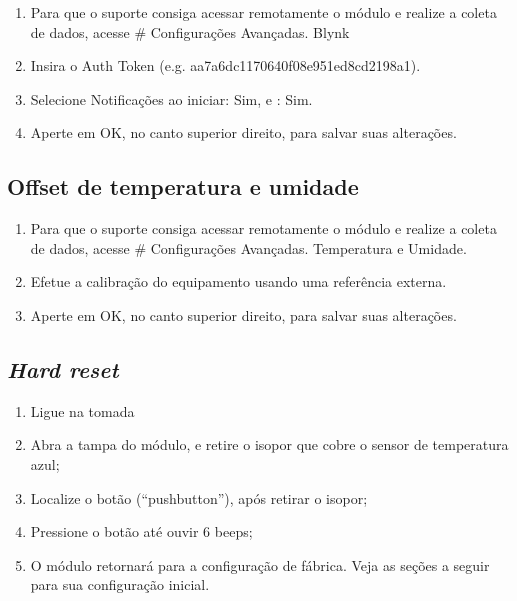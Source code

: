 \begin{enumerate}
    \item
    Para que o suporte consiga acessar remotamente o módulo e realize a coleta de dados, acesse \# \textrightarrow{} Configurações Avançadas.\textrightarrow{} Blynk

    \item
    Insira o Auth Token (e.g. aa7a6dc1170640f08e951ed8cd2198a1).

    \item
    Selecione Notificações ao iniciar: Sim, e \wwifi: Sim.

    \item
    Aperte em OK, no canto superior direito, para salvar suas alterações.
\end{enumerate}

\subsection{Offset de temperatura e umidade}

\begin{enumerate}
    \item
    Para que o suporte consiga acessar remotamente o módulo e realize a coleta de dados, acesse \# \textrightarrow{} Configurações Avançadas.\textrightarrow{} Temperatura e Umidade.

    \item
    Efetue a calibração do equipamento usando uma referência externa.

    \item
    Aperte em OK, no canto superior direito, para salvar suas alterações.
\end{enumerate}

\subsection{\emph{Hard reset}}
\begin{enumerate}
	\item Ligue na tomada
	\item Abra a tampa do módulo, e retire o isopor que cobre o sensor de temperatura azul;
	\item Localize o botão (“pushbutton”), após retirar o isopor;
	\item Pressione o botão até ouvir 6 beeps;
	\item O módulo retornará para a configuração de fábrica. Veja as seções a seguir para sua configuração inicial.
\end{enumerate}

